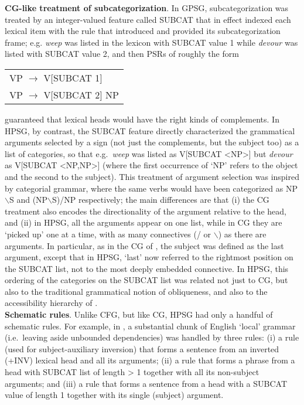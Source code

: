 \documentclass[output=paper]{langsci/langscibook}
\begin{document}
\noindent
{\bf CG-like treatment of subcategorization}. In GPSG, subcategorization was treated by an integer-valued feature called SUBCAT that in effect indexed each lexical item with the rule that introduced and provided its subcategorization frame; e.g. {\em weep} was listed in the lexicon with SUBCAT value 1 while {\em devour} was listed with SUBCAT value 2, and then PSRs of roughly the form

\begin{center}
\begin{tabular}{l}
          VP $\rightarrow$ V[SUBCAT 1] \\
          VP $\rightarrow$ V[SUBCAT 2] NP
\end{tabular}
\end{center}

\noindent
guaranteed that lexical heads would have the right kinds of complements.  In HPSG, by contrast, the SUBCAT feature directly characterized the grammatical arguments selected by a sign (not just the complements, but the subject too) as a list of categories, so that e.g.~{\em weep} was listed as V[SUBCAT <NP>] but {\em devour} as V[SUBCAT <NP,NP>] (where the first occurrence of `NP' refers to the object and the second to the subject). This treatment of argument selection was inspired by categorial grammar, where the same verbs would have been categorized as NP$\backslash$S and (NP$\backslash$S)/NP respectively; the main differences are that (i) the CG treatment also encodes the directionality of the argument relative to the head, and (ii) in HPSG, all the arguments appear on one list, while in CG they are `picked up' one at a time, with as many
connectives (/ or $\backslash$) as there are arguments. In particular, as in the CG of \citet{Dowty82b-ohne-crossref}, the subject was defined as the last argument, except that in HPSG, `last' now referred to the rightmost position on the SUBCAT list, not to the most deeply embedded connective. In HPSG, this
ordering of the categories on the SUBCAT list was related not just to CG, but also to the traditional grammatical notion of obliqueness, and also to the accessibility hierarchy of \citet{KC77a}.\\

\noindent
{\bf Schematic rules}. Unlike CFG, but like CG, HPSG had only a handful of schematic rules. For example, in \citet{Pollard85a-u}, a substantial chunk of English `local' grammar (i.e.~leaving aside unbounded dependencies) was handled by three rules: (i) a rule (used for subject-auxiliary inversion) that forms a sentence from an inverted (+INV) lexical head and all its arguments; (ii) a rule that forms a phrase from a head with SUBCAT list of length > 1 together with all its non-subject arguments; and (iii) a rule that forms a sentence from a head with a SUBCAT value of length 1 together with its single (subject) argument.\\
\end{document}
